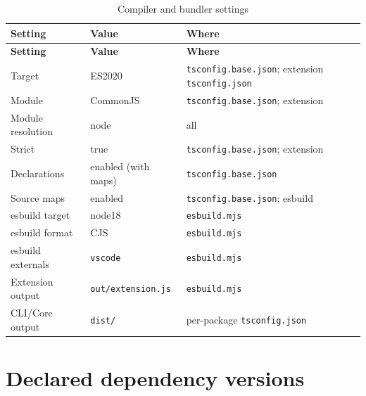 \begin{longtable}{@{}L{4.6cm}L{3.2cm}L{6.4cm}@{}}
\caption{Compiler and bundler settings}\\
\toprule
\textbf{Setting} & \textbf{Value} & \textbf{Where} \\
\midrule
\endfirsthead
\toprule
\textbf{Setting} & \textbf{Value} & \textbf{Where} \\
\midrule
\endhead
Target & ES2020 & \texttt{tsconfig.base.json}; extension \texttt{tsconfig.json} \\
Module & CommonJS & \texttt{tsconfig.base.json}; extension \\
Module resolution & node & all \\
Strict & true & \texttt{tsconfig.base.json}; extension \\
Declarations & enabled (with maps) & \texttt{tsconfig.base.json} \\
Source maps & enabled & \texttt{tsconfig.base.json}; esbuild \\
esbuild target & node18 & \texttt{esbuild.mjs} \\
esbuild format & CJS & \texttt{esbuild.mjs} \\
esbuild externals & \texttt{vscode} & \texttt{esbuild.mjs} \\
Extension output & \texttt{out/extension.js} & \texttt{esbuild.mjs} \\
CLI/Core output & \texttt{dist/} & per-package \texttt{tsconfig.json} \\
\bottomrule
\end{longtable}

\section{Declared dependency versions}

